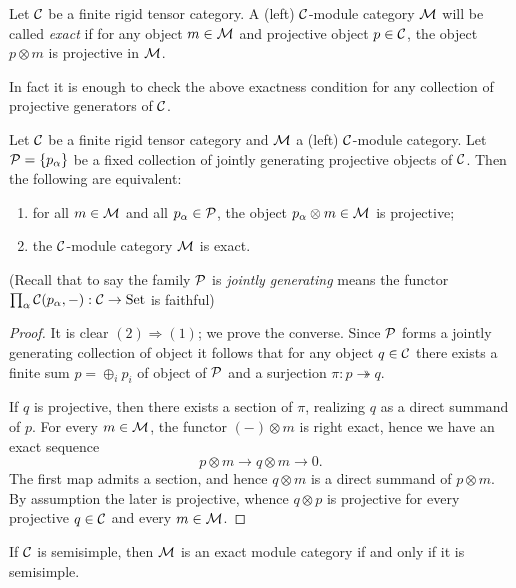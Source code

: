 \documentclass{amsart}
\begin{document}
\begin{definition}
	Let $\mathcal C$ be a finite rigid tensor category. A (left) $\mathcal C$-module category $\mathcal M$ will be called {\em exact} if for any object $m \in \mathcal M$ and  projective object $p \in \mathcal C$, the object $p \otimes m$ is projective in $\mathcal M$. 
\end{definition}

\noindent In fact it is enough to check the above exactness condition for any collection of projective generators of $\mathcal C$. 

\begin{lemma} \label{lma:Exact_checked_on_proj_gens}
	Let $\mathcal C$ be a finite rigid tensor category and $\mathcal M$ a (left) $\mathcal C$-module category. Let $\mathcal P = \{ p_\alpha \}$ be a fixed collection of jointly generating projective objects of  $\mathcal C$. Then the following are equivalent:
	\begin{enumerate}
		\item for all $m \in \mathcal M$ and all $p_\alpha \in \mathcal P$, the object $p_\alpha \otimes m \in \mathcal M$ is projective;
		\item the $\mathcal C$-module category $\mathcal M$ is exact.
	\end{enumerate}
	(Recall that to say the family $\mathcal P$ is {\em jointly generating} means the functor $\prod_\alpha\mathcal C(p_\alpha, -): \mathcal C \to \mathrm{Set}$ is faithful)
\end{lemma}

\begin{proof}
	It is clear $(2) \Rightarrow (1)$; we prove the converse. Since $\mathcal P$ forms a jointly generating collection of object it follows that for any object $q \in \mathcal C$ there exists a finite sum $p = \oplus_i p_i$ of object of $\mathcal P$ and a surjection $\pi:p \twoheadrightarrow q$. 
	
		 If $q$ is projective, then there exists a section of $\pi$, realizing $q$ as a direct summand of $p$. For every $m \in \mathcal M$, the functor $(-)\otimes m$ is right exact, hence we have an exact sequence
		\begin{equation*}
			p \otimes m \to q \otimes m \to 0.
		\end{equation*}
		 The first map admits a section, and hence $q \otimes m$ is a direct summand of $p \otimes m$. By assumption the later is projective, whence $q \otimes p$ is projective for every projective $q \in \mathcal C$ and every $m \in \mathcal M$. 
\end{proof}

\begin{example}
	If $\mathcal C$ is semisimple, then $\mathcal M$ is an exact module category if and only if it is semisimple.
\end{example}
\end{document}
